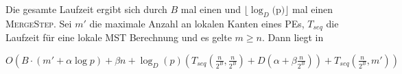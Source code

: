 Die gesamte Laufzeit ergibt sich durch $B$ mal einen \boruvkaStep \space und $\lfloor \log_{D}($p$) \rfloor$ mal einen \textsc{MergeStep}. 
Sei $m'$ die maximale Anzahl an lokalen Kanten eines PEs, $T_{seq}$ die Laufzeit für eine lokale MST Berechnung und es gelte $m \geq n$.
Dann liegt \boruvkaThenMerge in 
\begin{center}
$O(B \cdot (m' + \alpha \log p) + \beta n
+ \log_{D}(p)  (T_{seq}(\frac{n}{2^B},\frac{n}{2^B}) + D(\alpha + \beta \frac{n}{2^B}))
+ T_{seq}(\frac{n}{2^B},m')
)$
\end{center}
